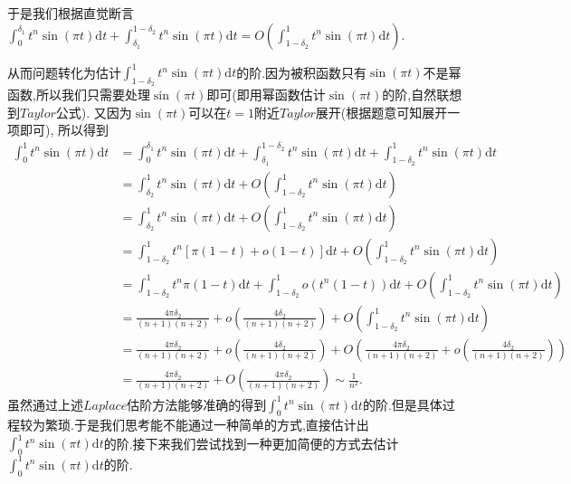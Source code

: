 \documentclass[lang=cn,newtx,10pt,scheme=chinese]{../Template/elegantbook}
\begin{document}
\begin{note}
于是我们根据直觉断言$\int_0^{\delta _1}{t^n\sin \left( \pi t \right) \mathrm{d}t}+\int_{\delta _1}^{1-\delta _2}{t^n\sin \left( \pi t \right) \mathrm{d}t}=O\left( \int_{1-\delta _2}^1{t^n\sin \left( \pi t \right) \mathrm{d}t} \right)$.

从而问题转化为估计$\int_{1-\delta _2}^1{t^n\sin \left( \pi t \right) \mathrm{d}t}$的阶.因为被积函数只有$\sin(\pi t)$不是幂函数,所以我们只需要处理$\sin(\pi t)$即可(即用幂函数估计$\sin(\pi t)$的阶,自然联想到$Taylor$公式).
又因为$\sin(\pi t)$可以在$t=1$附近$Taylor$展开(根据题意可知展开一项即可),
所以得到
\begin{align*}
\int_0^1{t^n\sin \left( \pi t \right) \mathrm{d}t}&=\int_0^{\delta _1}{t^n\sin \left( \pi t \right) \mathrm{d}t}+\int_{\delta _1}^{1-\delta _2}{t^n\sin \left( \pi t \right) \mathrm{d}t}+\int_{1-\delta _2}^1{t^n\sin \left( \pi t \right) \mathrm{d}t}
\\
&=\int_{\delta _2}^1{t^n\sin \left( \pi t \right) \mathrm{d}t}+O\left( \int_{1-\delta _2}^1{t^n\sin \left( \pi t \right) \mathrm{d}t} \right) 
\\
&=\int_{\delta _2}^1{t^n\sin \left( \pi t \right) \mathrm{d}t}+O\left( \int_{1-\delta _2}^1{t^n\sin \left( \pi t \right) \mathrm{d}t} \right) 
\\
&=\int_{1-\delta _2}^1{t^n\left[ \pi \left( 1-t \right) +o\left( 1-t \right) \right] \mathrm{d}t}+O\left( \int_{1-\delta _2}^1{t^n\sin \left( \pi t \right) \mathrm{d}t} \right) 
\\
&=\int_{1-\delta _2}^1{t^n\pi \left( 1-t \right) \mathrm{d}t}+\int_{1-\delta _2}^1{o\left( t^n\left( 1-t \right) \right) \mathrm{d}t}+O\left( \int_{1-\delta _2}^1{t^n\sin \left( \pi t \right) \mathrm{d}t} \right) 
\\
&=\frac{4\pi \delta _2}{\left( n+1 \right) \left( n+2 \right)}+o\left( \frac{4\delta _2}{\left( n+1 \right) \left( n+2 \right)} \right) +O\left( \int_{1-\delta _2}^1{t^n\sin \left( \pi t \right) \mathrm{d}t} \right) 
\\
&=\frac{4\pi \delta _2}{\left( n+1 \right) \left( n+2 \right)}+o\left( \frac{4\delta _2}{\left( n+1 \right) \left( n+2 \right)} \right) +O\left( \frac{4\pi \delta _2}{\left( n+1 \right) \left( n+2 \right)}+o\left( \frac{4\delta _2}{\left( n+1 \right) \left( n+2 \right)} \right) \right) 
\\
&=\frac{4\pi \delta _2}{\left( n+1 \right) \left( n+2 \right)}+O\left( \frac{4\pi \delta _2}{\left( n+1 \right) \left( n+2 \right)} \right) \sim \frac{1}{n^2}.
\end{align*}
虽然通过上述$Laplace$估阶方法能够准确的得到$\int_0^1{t^n\sin \left( \pi t \right) \mathrm{d}t}$的阶.但是具体过程较为繁琐.于是我们思考能不能通过一种简单的方式,直接估计出$\int_0^1{t^n\sin \left( \pi t \right) \mathrm{d}t}$的阶.接下来我们尝试找到一种更加简便的方式去估计$\int_0^1{t^n\sin \left( \pi t \right) \mathrm{d}t}$的阶.


\end{note}
\end{document}
